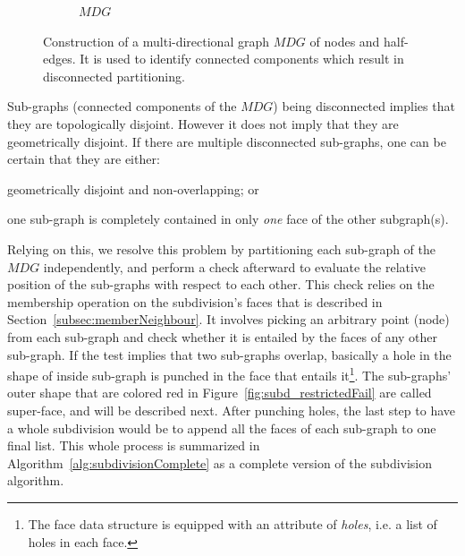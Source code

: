 \begin{figure}
\begin{subfigure}{.32\textwidth}
    \caption{$\mathit{MDG}$} \label{subfig:subd_mdg_c}
  \end{subfigure}%
  \caption[xxx]
          {Construction of a multi-directional graph $\mathit{MDG}$ of nodes and half-edges.
          It is used to identify connected components which result in disconnected partitioning.}
  \label{fig:subd_mdg}
\end{figure}

Sub-graphs (connected components of the $\mathit{MDG}$) being disconnected implies that they are topologically disjoint.
However it does not imply that they are geometrically disjoint.
If there are multiple disconnected sub-graphs, one can be certain that they are either:
\begin{inparaenum}
  \item geometrically disjoint and non-overlapping; or
  \item one sub-graph is completely contained in only \emph{one} face of the other subgraph(s).
\end{inparaenum}
Relying on this, we resolve this problem by partitioning each sub-graph of the $\mathit{MDG}$ independently,
and perform a check afterward to evaluate the relative position of the sub-graphs with respect to each other.
This check relies on the membership operation on the subdivision's faces that is described in Section~\ref{subsec:memberNeighbour}.
It involves picking an arbitrary point (node) from each sub-graph and check whether it is entailed by the faces of any other sub-graph.
If the test implies that two sub-graphs overlap, basically a hole in the shape of inside sub-graph is punched in the face that entails it\footnote{The face data structure is equipped with an attribute of \emph{holes}, i.e. a list of holes in each face.}.
The sub-graphs' outer shape that are colored red in Figure~\ref{fig:subd_restrictedFail} are called super-face, and will be described next.
After punching holes, the last step to have a whole subdivision would be to append all the faces of each sub-graph to one final list.
This whole process is summarized in Algorithm~\ref{alg:subdivisionComplete} as a complete version of the subdivision algorithm.

